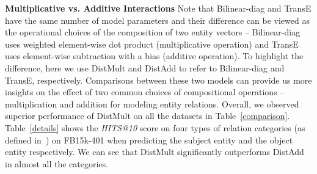\documentclass{article} \usepackage{iclr2015,times}
\begin{document}
\textbf{Multiplicative vs. Additive Interactions} Note that {\sc Bilinear-diag} and {\sc TransE} have the same number of model parameters and their difference can be viewed as the operational choices of the composition of two entity vectors -- {\sc Bilinear-diag} uses weighted element-wise dot product (multiplicative operation) and {\sc TransE} uses element-wise subtraction with a bias (additive operation). To highlight the difference, here we use {\sc DistMult} and {\sc DistAdd} to refer to {\sc Bilinear-diag} and {\sc TransE}, respectively.
Comparisons between these two models can provide us more insights on the effect of two common choices of compositional operations -- multiplication and addition for modeling entity relations. Overall, we observed superior performance of {\sc DistMult} on all the datasets in Table~\ref{comparison}. 
Table~\ref{details} shows the \textit{HITS@10} score on four types of relation categories (as defined in~\citep{BordesUsGaWeYa2013}) on FB15k-401 when predicting the subject entity and the object entity respectively. We can see that {\sc DistMult} significantly outperforms {\sc DistAdd} in almost all the categories. 
\begin{table*}[bth]
\begin{center}
\begin{footnotesize}
\end{footnotesize}
\caption{\label{details}Results by relation categories: one-to-one, one-to-many, many-to-one and many-to-many}
\end{center}
\end{table*}
\end{document}
